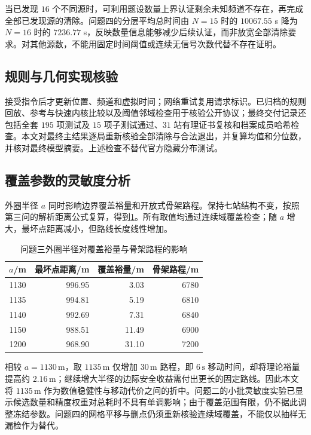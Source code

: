 当已发现 $16$ 个不同源时，可利用题设数量上界认证剩余未知频道不存在，再完成全部已发现源的清除。问题四的分层平均总时间由 $N=15$ 时的 $10067.55$ s 降为 $N=16$ 时的 $7236.77$ s，反映数量信息能够减少后续认证，而非放宽全部清除要求。对其他源数，不能用固定时间阈值或连续无信号次数代替不存在证明。

\subsection{规则与几何实现核验}
接受指令后才更新位置、频道和虚拟时间；网络重试复用请求标识。已归档的规则回放、参考与快速内核比较以及阈值邻域检查用于核验公开协议；最终交付记录还包括全套 $195$ 项测试及 $15$ 项子测试通过、$31$ 站有理证书复核和档案成员哈希检查。本文对最终主结果逐局重新核验全部清除与合法退出，并复算均值和分位数，并核对最终模型摘要。上述检查不替代官方隐藏分布测试。

\subsection{覆盖参数的灵敏度分析}
外圈半径 $a$ 同时影响边界覆盖裕量和开放式骨架路程。保持七站结构不变，按照第三问的解析距离公式复算，得到\cref{tab:q3-radius-sensitivity}。所有取值均通过连续域覆盖检查；随 $a$ 增大，最坏点距离减小，但路线长度线性增加。

\begin{table}[H]
  \centering
  \caption{问题三外圈半径对覆盖裕量与骨架路程的影响}
  \label{tab:q3-radius-sensitivity}
  \begin{tabular}{crrr}
    \toprule
    $a$/m & 最坏点距离/m & 覆盖裕量/m & 骨架路程/m \\
    \midrule
    1130 & 996.95 & 3.03 & 6780 \\
    1135 & 994.81 & 5.19 & 6810 \\
    1140 & 992.69 & 7.31 & 6840 \\
    1150 & 988.51 & 11.49 & 6900 \\
    1200 & 968.90 & 31.10 & 7200 \\
    \bottomrule
  \end{tabular}
\end{table}

相较 $a=1130\,\mathrm{m}$，取 $1135\,\mathrm{m}$ 仅增加 $30\,\mathrm{m}$ 路程，即 $6\,\mathrm{s}$ 移动时间，却将理论裕量提高约 $2.16\,\mathrm{m}$；继续增大半径的边际安全收益需付出更长的固定路线。因此本文将 $1135\,\mathrm{m}$ 作为数值稳健性与移动代价之间的折中。问题二的小批灵敏度实验已显示候选数量和精度权重对总耗时不具有单调影响；由于覆盖范围有限，仍不据此调整冻结参数。问题四的网格平移与删点仍须重新核验连续域覆盖，不能仅以抽样无漏检作为替代。
